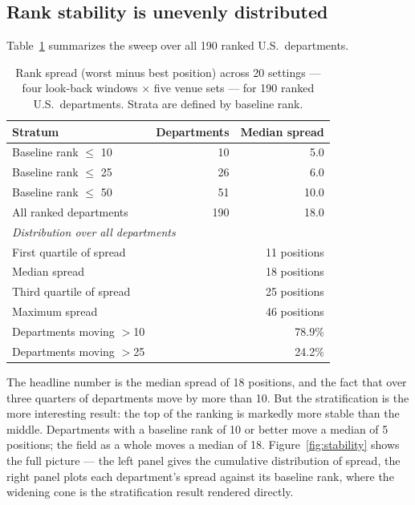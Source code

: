 \documentclass[11pt]{article}
\begin{document}
\subsection{Rank stability is unevenly distributed}
\label{sec:stabilityresults}

Table~\ref{tab:stability} summarizes the sweep over all 190 ranked U.S.\
departments.

\begin{table}[t]
\centering
\caption{Rank spread (worst minus best position) across 20 settings --- four
look-back windows $\times$ five venue sets --- for 190 ranked U.S.\
departments. Strata are defined by baseline rank.}
\label{tab:stability}
\begin{tabular}{lrr}
\toprule
Stratum & Departments & Median spread \\
\midrule
Baseline rank $\le$ 10   & 10  & 5.0 \\
Baseline rank $\le$ 25   & 26  & 6.0 \\
Baseline rank $\le$ 50   & 51  & 10.0 \\
All ranked departments   & 190 & 18.0 \\
\midrule
\multicolumn{3}{l}{\emph{Distribution over all departments}} \\
First quartile of spread   & \multicolumn{2}{r}{11 positions} \\
Median spread              & \multicolumn{2}{r}{18 positions} \\
Third quartile of spread   & \multicolumn{2}{r}{25 positions} \\
Maximum spread             & \multicolumn{2}{r}{46 positions} \\
Departments moving $>$10   & \multicolumn{2}{r}{78.9\%} \\
Departments moving $>$25   & \multicolumn{2}{r}{24.2\%} \\
\bottomrule
\end{tabular}
\end{table}

The headline number is the median spread of 18 positions, and the fact that
over three quarters of departments move by more than 10. But the stratification is
the more interesting result: the top of the ranking is markedly more stable
than the middle. Departments with a baseline rank of 10 or better move a median
of 5 positions; the field as a whole moves a median of 18.
Figure~\ref{fig:stability} shows the full picture --- the left panel gives the
cumulative distribution of spread, the right panel plots each department's
spread against its baseline rank, where the widening cone is the stratification
result rendered directly.
\end{document}
